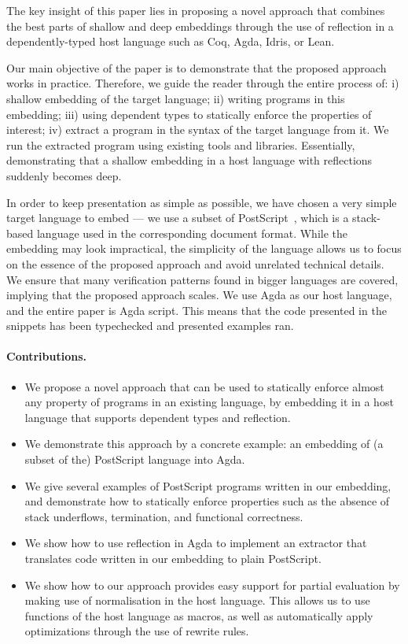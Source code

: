 \documentclass[sigplan,anonymous,review]{acmart}
\begin{document}
The key insight of this paper lies in proposing a novel approach that
combines the best parts of shallow and deep embeddings through the use
of reflection in a
dependently-typed host language such as Coq, Agda, Idris, or Lean.

Our main objective of the paper is to demonstrate that the
proposed approach works in practice.  Therefore, we guide the reader
through the entire process of: i) shallow embedding of the target
language;  ii) writing programs in this embedding; iii) using
dependent types to statically enforce the properties of interest; 
iv) extract a program in the syntax of the target language
from it.  We run the extracted program using existing
tools and libraries. Essentially, demonstrating that a
shallow embedding in a host language with reflections
suddenly becomes deep.

In order to keep presentation as simple as possible, we have
chosen a very simple target language to embed --- we use a subset
of PostScript~\cite{}, which is a stack-based
language used in the corresponding document format.  While the embedding
may look impractical, the simplicity of the language
allows us to focus on the essence of the proposed approach and avoid unrelated
technical details.  We ensure that many verification patterns found in bigger
languages are covered, implying that the proposed approach scales.
We use Agda as our host language, and the entire paper is Agda script.
This means that the code presented in the snippets has been typechecked
and presented examples ran.


\paragraph{Contributions.}
\begin{itemize}
  
\item We propose a novel approach that can be used to statically
  enforce almost any property of programs in an existing language, by
  embedding it in a host language that supports dependent types and
  reflection.

\item We demonstrate this approach by a concrete example: an embedding
  of (a subset of the) PostScript language into Agda.

\item We give several examples of PostScript programs written in our
  embedding, and demonstrate how to statically enforce properties such
  as the absence of stack underflows, termination, and functional
  correctness.

\item We show how to use reflection in Agda to implement an extractor
  that translates code written in our embedding to plain PostScript.

\item We show how to our approach provides easy support for partial
  evaluation by making use of normalisation in the host language. This
  allows us to use functions of the host language as macros, as well
  as automatically apply optimizations through the use of rewrite
  rules.
\end{itemize}
\end{document}
